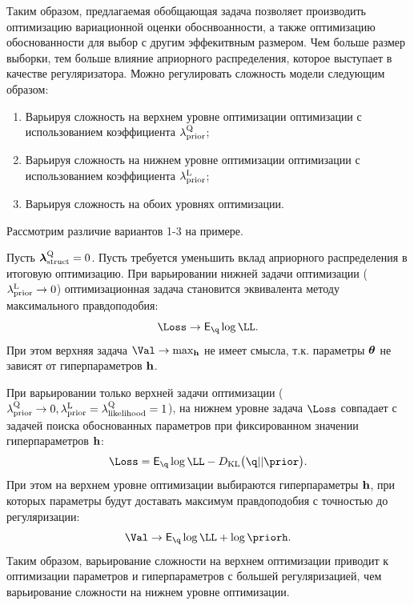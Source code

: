 Таким образом, предлагаемая обобщающая задача позволяет производить оптимизацию вариационной оценки обоснвоанности, а также оптимизацию обоснованности для выбор с другим эффекитвным размером. Чем больше размер выборки, тем больше влияние априорного распределения, которое выступает в качестве регуляризатора. Можно регулировать сложность модели следующим образом:
\begin{enumerate}
\item Варьируя сложность на верхнем уровне оптимизации оптимизации с использованием коэффициента $\lambda_\text{prior}^\text{Q}$;
\item Варьируя сложность на нижнем уровне оптимизации оптимизации с использованием коэффициента $\lambda_\text{prior}^\text{L}$;
\item Варьируя сложность на обоих уровнях оптимизации.
\end{enumerate}
Рассмотрим различие вариантов 1-3 на примере.
\begin{example}
Пусть $\boldsymbol{\lambda}_\text{struct}^\text{Q} = 0$.
Пусть требуется уменьшить вклад априорного распределения в итоговую оптимизацию.
При варьировании нижней задачи оптимизации ($\lambda_\text{prior}^\text{L} \to 0$) оптимизационная задача становится эквивалента методу максимального правдоподобия:
\[
   \Loss \to \E_{\q} \log \LL.
\]
При этом верхняя задача $\Val \to \max_{\h}$ не имеет смысла, т.к. параметры $\boldsymbol{\theta}$ не зависят от гиперпараметров $\mathbf{h}$.

При варьировании только верхней задачи оптимизации ($\lambda_\text{prior}^\text{Q} \to 0, \lambda_\text{prior}^\text{L} = \lambda_\text{likelihood}^\text{Q} = 1$), на нижнем уровне задача $\Loss$ совпадает с задачей поиска обоснованных параметров при фиксированном значении гиперпараметров $\mathbf{h}$:
\[
   \Loss = \E_{\q} \log \LL - \KL{\q}{\prior}.
\]
При этом на верхнем уровне оптимизации выбираются гиперпараметры $\mathbf{h}$, при которых параметры будут доставать максимум правдоподобия с точностью до регуляризации:
\[
    \Val \to \E_{\q} \log \LL  + \log \priorh.
\]
Таким образом, варьирование сложности на верхнем оптимизации приводит к оптимизации параметров и гиперпараметров с большей регуляризацией, чем варьирование сложности на нижнем уровне оптимизации.
\end{example}

